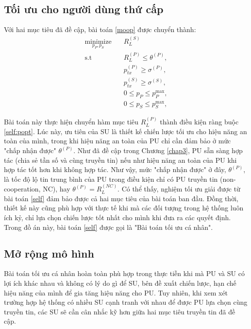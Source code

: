 \documentclass[../main.tex]{subfiles}
\begin{document}
\subsection{Tối ưu cho người dùng thứ cấp}

Với hai mục tiêu đã đề cập, bài toán \eqref{moop} được chuyển thành:
\begin{subequations}\label{self}
\begin{align}
\underset{p_P, p_S}{\text{minimize}} \quad & R_{L}^{(S)} \label{self:sopt} \\
\text{s.t} 
\quad & R_{L}^{(P)} \le \theta^{(P)}, \label{self:popt} \\
\quad & p_{tx}^{(P)} \geq \sigma^{(P)}, \label{self:ptxp} \\
\quad & p_{tx}^{(S)} \geq \sigma^{(S)}, \label{self:ptxs} \\
\quad & 0 \leq p_P \leq p_P^\text{max}, \label{self:pp} \\
\quad & 0 \leq p_S \leq p_S^\text{max}, \label{self:ps}
\end{align}
\end{subequations}

Bài toán này thực hiện chuyển hàm mục tiêu $R_{L}^{(P)}$ thành điều kiện ràng buộc \eqref{self:popt}. Lúc này, ưu tiên của SU là thiết kế chiến lược tối ưu cho hiệu năng an toàn của mình, trong khi hiệu năng an toàn của PU chỉ cần đảm bảo ở mức "chấp nhận được" $\theta^{(P)}$. Như đã đề cập trong Chương \ref{chap3}, PU sẵn sàng hợp tác (chia sẻ tần số và cùng truyền tin) nếu như hiệu năng an toàn của PU khi hợp tác tốt hơn khi không hợp tác. Như vậy, mức "chấp nhận được" ở đây, $\theta^{(P)}$, là tốc độ lộ tin trung bình của PU trong điều kiện chỉ có PU truyền tin (non-cooperation, NC), hay $\theta^{(P)} = R_L^{(NC)}$. Có thể thấy, nghiệm tối ưu giải được từ bài toán \eqref{self} đảm bảo được cả hai mục tiêu của bài toán ban đầu. Đồng thời, thiết kế này cũng phù hợp với thực tế khi mà các đối tượng trong hệ thống luôn ích kỷ, chỉ lựa chọn chiến lược tốt nhất cho mình khi đưa ra các quyết định. Trong đồ án này, bài toán \eqref{self} được gọi là "Bài toán tối ưu cá nhân".

\subsection{Mở rộng mô hình}

Bài toán tối ưu cá nhân hoàn toàn phù hợp trong thực tiễn khi mà PU và SU có lợi ích khác nhau và không có lý do gì để SU, bên đề xuất chiến lược, hạn chế hiệu năng của mình để gia tăng hiệu năng cho PU. Tuy nhiên, khi xem xét trường hợp hệ thống có nhiều SU cạnh tranh với nhau để được PU lựa chọn cùng truyền tin, các SU sẽ cần cân nhắc kỹ hơn giữa hai mục tiêu truyền tin đã đề cập.
\end{document}
